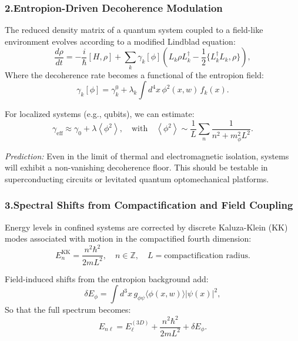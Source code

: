 \documentclass[12pt]{article}
\begin{document}
\subsubsection*{2.Entropion-Driven Decoherence Modulation}

The reduced density matrix of a quantum system coupled to a field-like environment evolves according to a modified Lindblad equation:
\begin{equation}
\frac{d \rho}{dt} = -\frac{i}{\hbar} [H, \rho] + \sum_k \gamma_k[\phi] \left( L_k \rho L_k^\dagger - \frac{1}{2} \{ L_k^\dagger L_k, \rho \} \right),
\label{eq:entropion_lindblad}
\end{equation}
Where the decoherence rate becomes a functional of the entropion field:
\begin{equation}
\gamma_k[\phi] = \gamma_k^0 + \lambda_k \int d^4x \, \phi^2(x, w) \, f_k(x).
\end{equation}

For localized systems (e.g., qubits), we can estimate:
\begin{equation}
\gamma_{\mathrm{eff}} \approx \gamma_0 + \lambda \left\langle \phi^2 \right\rangle, \quad \text{with} \quad \left\langle \phi^2 \right\rangle \sim \frac{1}{L} \sum_n \frac{1}{n^2 + m_\phi^2 L^2}.
\label{eq:residual_decoherence}
\end{equation}

\emph{Prediction:} Even in the limit of thermal and electromagnetic isolation, systems will exhibit a non-vanishing decoherence floor. This should be testable in superconducting circuits or levitated quantum optomechanical platforms.

\subsubsection*{3.Spectral Shifts from Compactification and Field Coupling}

Energy levels in confined systems are corrected by discrete Kaluza-Klein (KK) modes associated with motion in the compactified fourth dimension:
\begin{equation}
E_n^{\mathrm{KK}} = \frac{n^2 \hbar^2}{2m L^2}, \quad n \in \mathbb{Z}, \quad L = \text{compactification radius}.
\label{eq:kk_modes}
\end{equation}

Field-induced shifts from the entropion background add:
\begin{equation}
\delta E_\phi = \int d^3x \, g_{\phi\psi} \langle \phi(x, w) \rangle |\psi(x)|^2,
\end{equation}
So that the full spectrum becomes:
\begin{equation}
E_{n\ell} = E_{\ell}^{(3D)} + \frac{n^2 \hbar^2}{2m L^2} + \delta E_\phi.
\end{equation}
\end{document}
